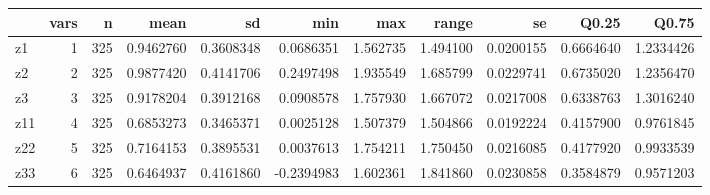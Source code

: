 \documentclass[]{article}
\begin{document}
\begin{tabular}{l|r|r|r|r|r|r|r|r|r|r}
\hline
  & vars & n & mean & sd & min & max & range & se & Q0.25 & Q0.75\\
\hline
z1 & 1 & 325 & 0.9462760 & 0.3608348 & 0.0686351 & 1.562735 & 1.494100 & 0.0200155 & 0.6664640 & 1.2334426\\
\hline
z2 & 2 & 325 & 0.9877420 & 0.4141706 & 0.2497498 & 1.935549 & 1.685799 & 0.0229741 & 0.6735020 & 1.2356470\\
\hline
z3 & 3 & 325 & 0.9178204 & 0.3912168 & 0.0908578 & 1.757930 & 1.667072 & 0.0217008 & 0.6338763 & 1.3016240\\
\hline
z11 & 4 & 325 & 0.6853273 & 0.3465371 & 0.0025128 & 1.507379 & 1.504866 & 0.0192224 & 0.4157900 & 0.9761845\\
\hline
z22 & 5 & 325 & 0.7164153 & 0.3895531 & 0.0037613 & 1.754211 & 1.750450 & 0.0216085 & 0.4177920 & 0.9933539\\
\hline
z33 & 6 & 325 & 0.6464937 & 0.4161860 & -0.2394983 & 1.602361 & 1.841860 & 0.0230858 & 0.3584879 & 0.9571203\\
\hline
\end{tabular}
\end{document}
